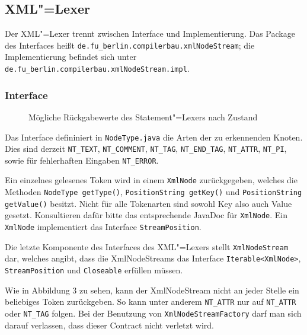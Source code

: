 \documentclass[10pt,a4paper,ngerman,titlepage,tocindentauto]{scrartcl}
\newcommand{\n}{\linebreak[1]}
\begin{document}
		\subsection[XML-Lexer]{\hypertarget{XML-Lexer-API}{XML"=Lexer}}
			Der XML"=Lexer trennt zwischen Interface und Implementierung.
			Das Package des Interfaces heißt \texttt{de.{\n}fu\_berlin.{\n}compilerbau.{\n}xmlNodeStream};
			die Implementierung befindet sich unter \texttt{de.{\n}fu\_berlin.{\n}compilerbau.{\n}xmlNodeStream.{\n}impl}.
			
			\subsubsection*{Interface}
				\begin{wrapfigure}{R}{0.3\textwidth}
					\vspace{-22pt}
					\caption{Mög\-li\-che Rück\-ga\-be\-wer\-te des State\-ment"=Le\-xers nach Zu\-stand}
					\vspace{-30pt}
				\end{wrapfigure}
				
				Das Interface defininiert in \texttt{NodeType.java} die Arten der zu erkennenden Knoten.
				Dies sind derzeit \texttt{NT\_TEXT}, \texttt{NT\_COMMENT}, \texttt{NT\_TAG}, \texttt{NT\_END\_TAG},
				\texttt{NT\_ATTR}, \texttt{NT\_PI}, sowie für fehlerhaften Eingaben \texttt{NT\_ERROR}.
				
				Ein einzelnes gelesenes Token wird in einem \texttt{XmlNode} zurückgegeben, welches die Methoden
				\texttt{NodeType getType()}, \texttt{PositionString getKey()} und \texttt{PositionString getValue()}
				besitzt. Nicht für alle Tokenarten sind sowohl Key also auch Value gesetzt. Konsultieren dafür
				bitte das entsprechende JavaDoc für \texttt{XmlNode}. Ein \texttt{XmlNode} implementiert das Interface
				\texttt{StreamPosition}.
				
				Die letzte Komponente des Interfaces des XML"=Lexers stellt \texttt{XmlNodeStream} dar, welches
				angibt, dass die XmlNodeStreams das Interface \texttt{Iterable<{\n}XmlNode>}, \texttt{StreamPosition} und
				\texttt{Closeable} erfüllen müssen.
				
				Wie in Abbildung 3 zu sehen, kann der XmlNodeStream nicht an jeder Stelle ein beliebiges Token zurückgeben.
				So kann unter anderem \texttt{NT\_ATTR} nur auf \texttt{NT\_ATTR} oder \texttt{NT\_TAG} folgen.
				Bei der Benutzung von \texttt{XmlNodeStreamFactory} darf man sich darauf verlassen, dass dieser Contract
				nicht verletzt wird.
			
\end{document}
